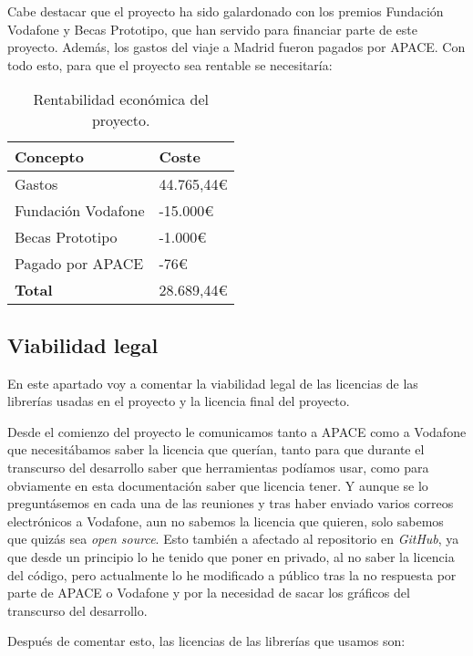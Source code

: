 Cabe destacar que el proyecto ha sido galardonado con los premios Fundación Vodafone y Becas Prototipo, que han servido para financiar parte de este proyecto. Además, los gastos del viaje a Madrid fueron pagados por APACE. Con todo esto, para que el proyecto sea rentable se necesitaría:

\begin{table}[H]
	\centering
	\begin{tabular}{ll}
		\toprule
		\textbf{Concepto} & \textbf{Coste} \\ \midrule
		Gastos & 44.765,44\euro   \\
		Fundación Vodafone    & -15.000\euro       \\
		Becas Prototipo      & -1.000\euro         \\
		Pagado por APACE      & -76\euro         \\ \midrule
		\textbf{Total}    & 28.689,44\euro   \\ \bottomrule
	\end{tabular}
	\caption{Rentabilidad económica del proyecto.}
\end{table}

\subsection{Viabilidad legal}
En este apartado voy a comentar la viabilidad legal de las licencias de las librerías usadas en el proyecto y la licencia final del proyecto.

Desde el comienzo del proyecto le comunicamos tanto a APACE como a Vodafone que necesitábamos saber la licencia que querían, tanto para que durante el transcurso del desarrollo saber que herramientas podíamos usar, como para obviamente en esta documentación saber que licencia tener. Y aunque se lo preguntásemos en cada una de las reuniones y tras haber enviado varios correos electrónicos a Vodafone, aun no sabemos la licencia que quieren, solo sabemos que quizás sea \textit{open source}. Esto también a afectado al repositorio en \textit{GitHub}, ya que desde un principio lo he tenido que poner en privado, al no saber la licencia del código, pero actualmente lo he modificado a público tras la no respuesta por parte de APACE o Vodafone y por la necesidad de sacar los gráficos del transcurso del desarrollo.

Después de comentar esto, las licencias de las librerías que usamos son:

